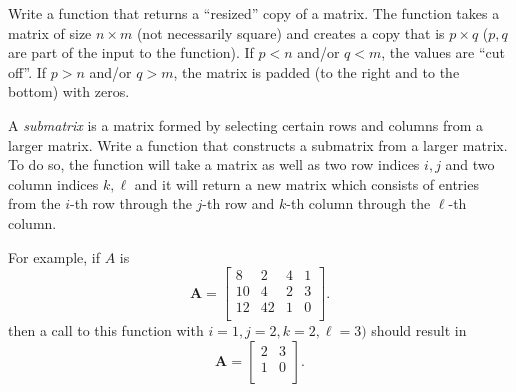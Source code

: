 \begin{exer}
Write a function that returns a ``resized'' copy of a matrix.  
The function takes a matrix of size $n \times m$ (not necessarily 
square) and creates a copy that is $p \times q$ ($p, q$ are part
of the input to the function).  If $p < n$ and/or $q < m$, the 
values are ``cut off''.  If $p > n$ and/or $q > m$, the matrix is 
padded (to the right and to the bottom) with zeros.  
\end{exer}

\begin{exer}
A \emph{submatrix} is a matrix formed by selecting certain rows 
and columns from a larger matrix.  Write a function that constructs 
a submatrix from a larger matrix.  To do so, the function will take
a matrix as well as two row indices $i, j$ and two column indices
$k, \ell$ and it will return a new matrix which consists of entries
from the $i$-th row through the $j$-th row and $k$-th column 
through the $\ell$-th column.

For example, if $A$ is
$$\mathbf{A}=\begin{bmatrix}
    8 & 2 & 4 & 1 \\
   10 & 4 & 2 & 3 \\
   12 & 42 & 1 & 0 \\
  \end{bmatrix}.$$
then a call to this function with $i=1, j=2, k=2, \ell=3)$ should
result in
$$\mathbf{A}=\begin{bmatrix}
   2 & 3 \\
   1 & 0 \\
  \end{bmatrix}.$$
\end{exer}

